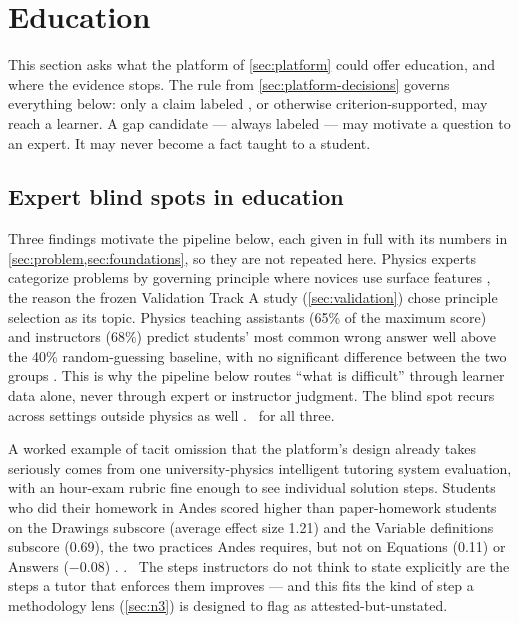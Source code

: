 \section{Education}
\label{sec:education}

This section asks what the platform of \cref{sec:platform} could offer education, and where the
evidence stops. The rule from \cref{sec:platform-decisions} governs everything below: only a claim
labeled , or otherwise criterion-supported, may reach a learner. A
gap candidate --- always labeled  --- may motivate a question to an expert. It may
never become a fact taught to a student.

\subsection{Expert blind spots in education}
\label{sec:education-blindspots}

Three findings motivate the pipeline below, each given in full with its numbers in
\cref{sec:problem,sec:foundations}, so they are not repeated here. Physics experts categorize
problems by governing principle where novices use surface features
\parencite{chi1981categorization}, the reason the frozen Validation Track A study
(\cref{sec:validation}) chose principle selection as its topic. Physics teaching assistants (65\% of the maximum score) and instructors (68\%) predict students'
most common wrong answer well above the 40\% random-guessing baseline, with no significant
difference between the two groups \parencite{maries2016teaching}. This is why the pipeline below
routes ``what is difficult'' through learner data alone, never through expert or instructor
judgment. The
blind spot recurs across settings outside physics as well \parencite{nathan2003expert}. \evlit\ for
all three.

A worked example of tacit omission that the platform's design already takes seriously comes from
one university-physics intelligent tutoring system evaluation, with an hour-exam rubric fine enough
to see individual solution steps. Students who did their homework in Andes scored higher than
paper-homework students on the Drawings subscore (average effect size 1.21) and the Variable
definitions subscore (0.69), the two practices Andes requires, but not on Equations (0.11) or
Answers ($-0.08$) \parencite[Table~5]{vanlehn2005andes}.
\evlit. \evint\ The
steps instructors do not think to state explicitly are the steps a tutor that enforces
them improves --- and this fits the kind of step a methodology lens (\cref{sec:n3}) is designed to
flag as attested-but-unstated.

